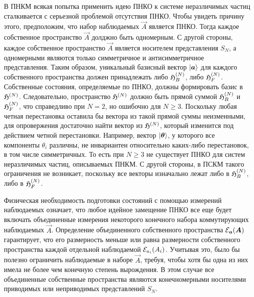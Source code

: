 \documentclass[a4paper, 12pt]{article}
\begin{document}
В ПНКМ всякая попытка применить идею ПНКО к системе неразличимых частиц 
сталкивается с серьезной проблемой отсутствия ПНКО. Чтобы увидеть 
причину этого, предположим, что набор наблюдаемых $\vec{A}$ является 
ПНКО. Тогда каждое собственное пространство $\vec{A}$ долджно быть 
одномерным. С другой стороны, каждое собственное пространство $\vec{A}$ 
является носителем представления $S_N$, а одномерными являются только 
симметричное и антисимметричное представления. %
Таким образом, уникальный базисный вектор ${\left|{\boldsymbol{a}}{}\right\rangle}$ для каждого 
собственного пространства должен принадлежать либо $\mathfrak{H}^{(N)}_B$, либо 
$\mathfrak{H}^{(N)}_F$. Собственные состояния, определяемые по ПНКО, должны 
формировать базис в $\mathfrak{H}^{(N)}$. Следовательно, пространство $\mathfrak{H}^{(N)}$ 
должно быть прямой суммой $\mathfrak{H}^{(N)}_B$ и $\mathfrak{H}^{(N)}_F$, что справедливо при 
$N=2$, но ошибочно для $N\geq3$. Поскольку любая четная перестановка 
оставила бы вектора из такой прямой суммы неизменными, для опровержения 
достаточно найти вектор из $\mathfrak{H}^{(N)}$, который изменится под действием 
четной перестановки. Например, вектор ${\left|{\boldsymbol{\theta}}{}\right\rangle}$, у которого 
все компоненты $\theta_i$ различны, не инвариантен относительно 
каких-либо перестановок, в том числе симметричных. То есть при $N\geq3$ 
не существует ПНКО для систем неразличимых частиц, описываемых ПНКМ.
%
С другой стороны, в ПСКМ такого ограничения не возникает, поскольку все 
векторы изначально лежат либо в $\mathfrak{H}^{(N)}_B$, либо в $\mathfrak{H}^{(N)}_F$.

Физическая необходимость подготовки состояний с помощью измерений 
наблюдаемых означает, что любое идейное замещение ПНКО все еще будет 
включать объединенные измерения некоторого конечного набора 
коммутирующих наблюдаемых $\vec{A}$. Определение объединенного 
собственного пространства ${\mathcal{E}}_{\boldsymbol{a}}{}({\boldsymbol{A}}{})$ гарантирует, что его 
размерность меньше или равна размерности собственного пространства 
каждой отдельной наблюдаемой ${\mathcal{E}}_{a_i}({A_i})$. Учитывая это, было бы 
полезно ограничить наблюдаемые в наборе $\vec{A}$, требуя, чтобы хотя бы 
одна из них имела не более чем конечную степень вырождения. В этом 
случае все объединенные собственные пространства являются конечномерными 
носителями приводимых или неприводимых представлений $S_N$.
\end{document}
